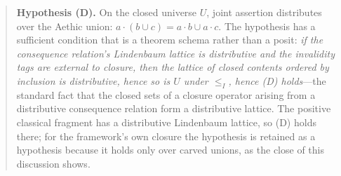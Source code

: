 \begin{quote}
\textbf{Hypothesis (D).} On the closed universe $U$, joint assertion distributes over the Aethic union: $a \cdot (b \cup c) = a\cdot b \cup a \cdot c$. The hypothesis has a sufficient condition that is a theorem schema rather than a posit: \emph{if the consequence relation's Lindenbaum lattice is distributive and the invalidity tags are external to closure, then the lattice of closed contents ordered by inclusion is distributive, hence so is $U$ under $\le_I$, hence (D) holds}---the standard fact that the closed sets of a closure operator arising from a distributive consequence relation form a distributive lattice. The positive classical fragment has a distributive Lindenbaum lattice, so (D) holds there; for the framework's own closure the hypothesis is retained as a hypothesis because it holds only over carved unions, as the close of this discussion shows.
\end{quote}

